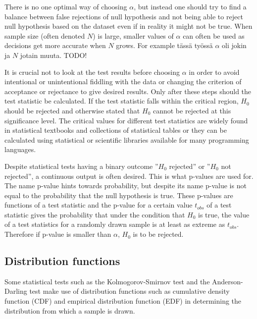 \documentclass[english, oneside]{HYgradu}
\begin{document}
There is no one optimal way of choosing $\alpha$, but instead one should try to find a balance between false rejections of null hypothesis and not being able to reject null hypothesis based on the dataset even if in reality it might not be true. When sample size (often denoted $N$) is large, smaller values of $\alpha$ can often be used as decisions get more accurate when $N$ grows. For example tässä työssä $\alpha$ oli jokin ja $N$ jotain muuta. TODO! %

It is crucial not to look at the test results before choosing $\alpha$ in order to avoid intentional or unintentional fiddling with the data or changing the criterion of acceptance or rejectance to give desired results. Only after these steps should the test statistic be calculated. If the test statistic falls within the critical region, $H_0$ should be rejected and otherwise stated that $H_0$ cannot be rejected at this significance level. The critical values for different test statistics are widely found in statistical textbooks and collections of statistical tables or they can be calculated using statistical or scientific libraries available for many programming languages.

Despite statistical tests having a binary outcome ''$H_0$ rejected'' or ''$H_0$ not rejected'', a continuous output is often desired. This is what p-values are used for. The name p-value hints towards probability, but despite its name p-value is not equal to the probability that the null hypothesis is true. These p-values are functions of a test statistic and the p-value for a certain value $t_{obs}$ of a test statistic gives the probability that under the condition that $H_0$ is true, the value of a test statistics for a randomly drawn sample is at least as extreme as $t_{obs}$. Therefore if p-value is smaller than $\alpha$, $H_0$ is to be rejected.

\subsection{Distribution functions} \label{sect:distribution-functions}
Some statistical tests such as the Kolmogorov-Smirnov test and the Anderson-Darling test make use of distribution functions such as cumulative density function (CDF) and empirical distribution function (EDF) in determining the distribution from which a sample is drawn. %
\end{document}
